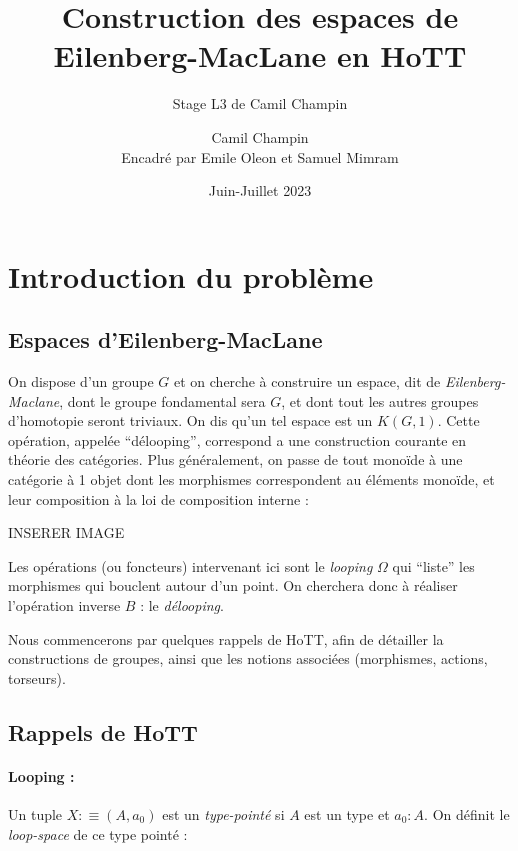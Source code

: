 \documentclass{article}
\title{Construction des espaces de Eilenberg-MacLane en HoTT}
\author{Stage L3 de Camil Champin}
\author{Camil Champin\\[1ex]
\small Encadré par Emile Oleon et Samuel Mimram}  %
\date{Juin-Juillet 2023}
\begin{document}
\maketitle

\section{Introduction du problème}

\subsection{Espaces d'Eilenberg-MacLane}

%

On dispose d'un groupe $G$ et on cherche à construire un espace, dit de \emph{Eilenberg-Maclane}, dont le groupe fondamental sera $G$, et dont tout les autres groupes d'homotopie seront triviaux. On dis qu'un tel espace est un $K(G,1)$. Cette opération, appelée ``délooping'', correspond a une construction courante en théorie des catégories. Plus généralement, on passe de tout monoïde à une catégorie à 1 objet dont les morphismes correspondent au éléments monoïde, et leur composition à la loi de composition interne :

INSERER IMAGE

Les opérations (ou foncteurs) intervenant ici sont le \emph{looping} $\Omega$ qui ``liste'' les morphismes qui bouclent autour d'un point. On cherchera donc à réaliser l'opération inverse $B$ : le \emph{délooping}.


Nous commencerons par quelques rappels de HoTT, afin de détailler la constructions de groupes, ainsi que les notions associées (morphismes, actions, torseurs).

\subsection{Rappels de HoTT}

\paragraph{Looping :} Un tuple $X :\equiv (A,a_0)$ est un \emph{type-pointé} si $A$ est un type et $a_0 : A$. On définit le \emph{loop-space} de ce type pointé :
\end{document}
